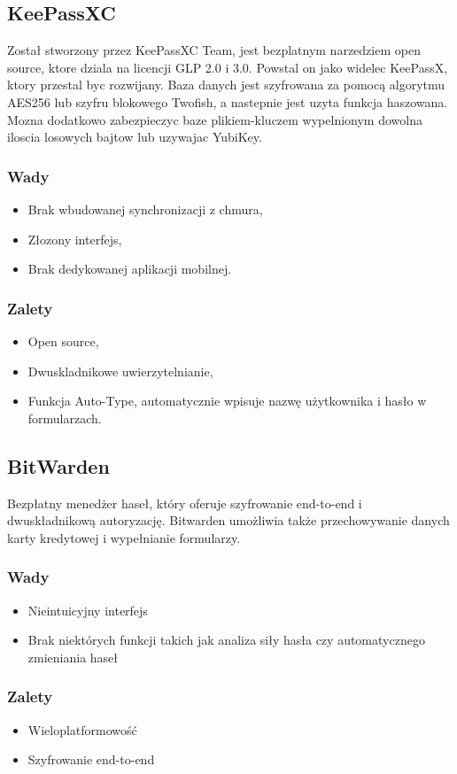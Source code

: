 \subsection{KeePassXC}
Został stworzony przez KeePassXC Team, jest bezplatnym narzedziem open source, ktore dziala na licencji GLP 2.0 i 3.0. Powstal on jako widelec KeePassX, ktory przestal byc rozwijany.
Baza danych jest szyfrowana za pomocą algorytmu AES256 lub szyfru blokowego Twofish, a nastepnie jest uzyta funkcja haszowana. Mozna dodatkowo zabezpieczyc baze plikiem-kluczem wypelnionym dowolna iloscia losowych bajtow lub uzywajac YubiKey. 
\subsubsection{Wady}
\begin{itemize}
    \item Brak wbudowanej synchronizacji z chmura,
    \item Złozony interfejs,
    \item Brak dedykowanej aplikacji mobilnej.
\end{itemize}

\subsubsection{Zalety}
\begin{itemize}
    \item Open source,
    \item Dwuskladnikowe uwierzytelnianie,
    \item Funkcja Auto-Type, automatycznie wpisuje nazwę użytkownika i hasło w formularzach.
\end{itemize}


\subsection{BitWarden}

Bezpłatny menedżer haseł, który oferuje szyfrowanie end-to-end i dwuskładnikową autoryzację. Bitwarden umożliwia także przechowywanie danych karty kredytowej i wypełnianie formularzy.

\subsubsection{Wady}
\begin{itemize}
    \item Nieintuicyjny interfejs
    \item Brak niektórych funkcji takich jak analiza siły hasła czy automatycznego zmieniania haseł
\end{itemize}
\subsubsection{Zalety}
\begin{itemize}
    \item Wieloplatformowość
    \item Szyfrowanie end-to-end
\end{itemize}
